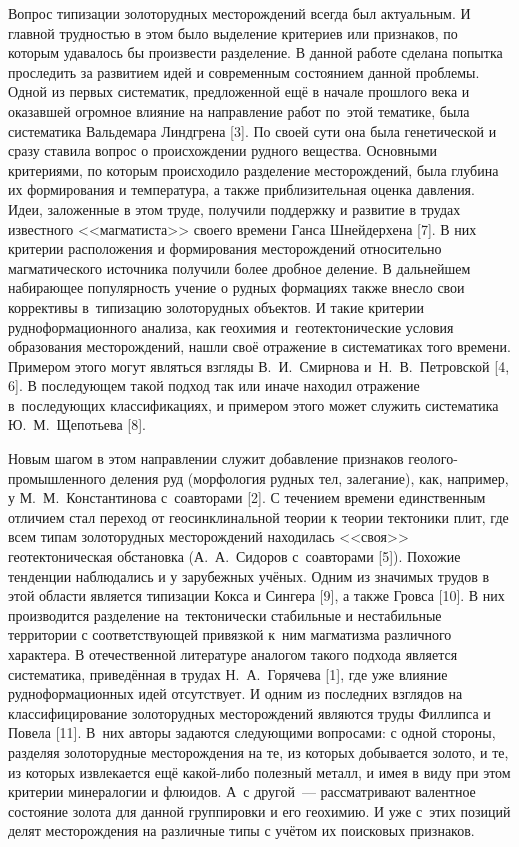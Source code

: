  

\makeProcTitle
{}

Вопрос типизации золоторудных месторождений всегда был актуальным. И главной трудностью в этом было выделение критериев или признаков, по которым удавалось бы произвести разделение. В данной работе сделана попытка проследить за развитием идей и современным состоянием данной проблемы. Одной из первых систематик, предложенной ещё в начале прошлого века и оказавшей огромное влияние на направление работ по~этой тематике, была систематика Вальдемара Линдгрена [3]. По своей сути она была генетической и сразу ставила вопрос о происхождении рудного вещества.  Основными критериями, по которым происходило разделение месторождений, была глубина их формирования и температура, а также приблизительная оценка давления. Идеи, заложенные в этом труде, получили поддержку и развитие в трудах известного <<магматиста>> своего времени Ганса Шнейдерхена [7]. В них критерии расположения и формирования месторождений относительно магматического источника получили более дробное деление.  В дальнейшем набирающее популярность учение о рудных формациях также внесло свои коррективы в~типизацию золоторудных объектов. И такие критерии рудноформационного анализа, как геохимия и~геотектонические условия образования месторождений, нашли своё отражение в систематиках того времени. Примером этого могут являться взгляды В.~И.~Смирнова и~Н.~В.~Петровской [4, 6]. В последующем такой подход так или иначе находил отражение в~последующих классификациях, и примером этого может служить систематика Ю.~М.~Щепотьева [8].

Новым шагом в этом направлении служит добавление признаков геолого-промышленного деления руд (морфология рудных тел, залегание), как, например, у М.~М.~Константинова с~соавторами [2]. С течением времени единственным отличием стал переход от геосинклинальной теории к теории тектоники плит, где всем типам золоторудных месторождений находилась <<своя>> геотектоническая обстановка (А.~А.~Сидоров с~соавторами [5]). Похожие тенденции наблюдались и у зарубежных учёных. Одним из значимых трудов в этой области является типизации Кокса и Сингера [9], а также Гровса [10]. В них производится разделение на~тектонически стабильные и нестабильные территории с соответствующей привязкой к~ним магматизма различного характера. В отечественной литературе аналогом такого подхода является систематика, приведённая в трудах Н.~А.~Горячева [1], где уже влияние рудноформационных идей отсутствует. И одним из последних взглядов на классифицирование золоторудных месторождений являются труды Филлипса и Повела [11]. В~них авторы задаются следующими вопросами: с одной стороны, разделяя золоторудные месторождения на те, из которых добывается золото, и те, из которых извлекается ещё какой-либо полезный металл, и имея в виду при этом критерии минералогии и флюидов. А~с другой~--- рассматривают валентное состояние золота для данной группировки и его геохимию. И уже с~этих позиций делят месторождения на различные типы с учётом их поисковых признаков.

